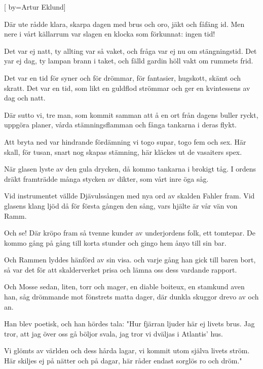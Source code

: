 
[
	by={Artur Eklund}]

\beginverse*
Där ute rådde klara, skarpa dagen
med brus och oro, jäkt och fåfäng id.
Men nere i vårt källarrum var slagen
en klocka som förkunnat: ingen tid!
\endverse

\beginverse*
Det var ej natt, ty allting var så vaket,
och fråga var ej nu om stängningstid.
Det yar ej dag, ty lampan brann i taket,
och fälld gardin höll vakt om rummets frid.
\endverse

\beginverse*
Det var en tid för syner och för drömmar,
för fantasier, hugskott, skämt och skratt.
Det var en tid, som likt en guldflod strömmar
och ger en kvintessens av dag och natt.
\endverse

\beginverse*
Där sutto vi, tre man, som kommit samman
att å en ort från dagens buller ryckt,
uppgöra planer, vårda stämningsflamman
och fånga tankarna i deras flykt.
\endverse

\beginverse*
Att bryta ned var hindrande fördämning
vi togo supar, togo fem och sex.
Här skall, för tusan, snart nog skapas stämning,
här kläckes ut de vasaiters spex.
\endverse

\beginverse*
När glasen lyste av den gula drycken,
då kommo tankarna i brokigt tåg.
I ordens dräkt framträdde många stycken
av dikter, som vårt inre öga såg.
\endverse

\newpage
\beginverse*
Vid instrumentet vällde Djävulssången
med nya ord av skalden Fahler fram.
Vid glasens klang ljöd då för första gången
den sång, vars hjälte är vår vän von Ramm.
\endverse

\beginverse*
Och se! Där kröpo fram så tvenne kunder
av underjordens folk, ett tomtepar.
De kommo gång på gång till korta stunder
och gingo hem ånyo till sin bar.
\endverse

\beginverse*
Och Rammen lyddes hänförd av sin visa.
och varje gång han gick till baren bort,
så var det för att skalderverket prisa
och lämna oss dess vardande rapport.
\endverse

\beginverse*
Och Mosse sedan, liten, torr och mager,
en diable boiteux, en stamkund aven han,
såg drömmande mot fönstrets matta dager,
där dunkla skuggor drevo av och an.
\endverse

\beginverse*
Han blev poetisk, och han hördes tala:
"Hur fjärran ljuder här ej livets brus.
Jag tror, att jag över oss gå böljor svala,
jag tror vi dväljas i Atlantis' hus.
\endverse

\beginverse*
Vi glömts av världen och dess hårda lagar,
vi kommit utom själva livets ström.
Här skiljes ej på nätter och på dagar,
här råder endast sorglös ro och dröm."
\endverse

